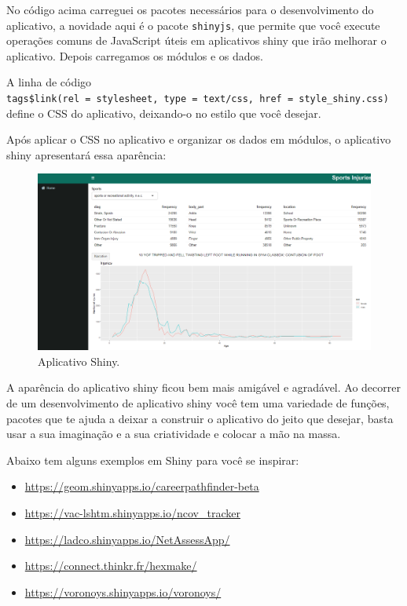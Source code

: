 \documentclass[
]{book}
\providecommand{\tightlist}{%
  \setlength{\itemsep}{0pt}\setlength{\parskip}{0pt}}
\begin{document}
No código acima carreguei os pacotes necessários para o desenvolvimento do aplicativo, a novidade aqui é o pacote \texttt{shinyjs}, que permite que você execute operações comuns de JavaScript úteis em aplicativos shiny que irão melhorar o aplicativo. Depois carregamos os módulos e os dados.

A linha de código \texttt{tags\$link(rel\ =\ \textquotesingle{}stylesheet\textquotesingle{},\ type\ =\ \textquotesingle{}text/css\textquotesingle{},\ href\ =\ \textquotesingle{}style\_shiny.css\textquotesingle{})} define o CSS do aplicativo, deixando-o no estilo que você desejar.

Após aplicar o CSS no aplicativo e organizar os dados em módulos, o aplicativo shiny apresentará essa aparência:

\begin{figure}

{\centering \includegraphics[width=1\linewidth]{www/img/apli_final} 

}

\caption{Aplicativo Shiny.}\label{fig:unnamed-chunk-54}
\end{figure}

A aparência do aplicativo shiny ficou bem mais amigável e agradável. Ao decorrer de um desenvolvimento de aplicativo shiny você tem uma variedade de funções, pacotes que te ajuda a deixar a construir o aplicativo do jeito que desejar, basta usar a sua imaginação e a sua criatividade e colocar a mão na massa.

Abaixo tem alguns exemplos em Shiny para você se inspirar:

\begin{itemize}
\tightlist
\item
  \url{https://geom.shinyapps.io/careerpathfinder-beta}
\item
  \url{https://vac-lshtm.shinyapps.io/ncov_tracker}
\item
  \url{https://ladco.shinyapps.io/NetAssessApp/}
\item
  \url{https://connect.thinkr.fr/hexmake/}
\item
  \url{https://voronoys.shinyapps.io/voronoys/}
\end{itemize}
\end{document}
